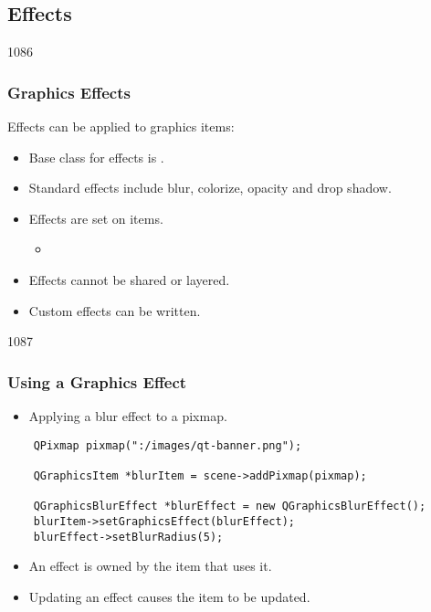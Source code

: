 \subsection{Effects}

\begin{slide}{1086}\frametitle{Graphics Effects}

Effects can be applied to graphics items:

\begin{itemize}
\item Base class for effects is .
\item Standard effects include blur, colorize, opacity and drop shadow.
\item Effects are set on items.
  \begin{itemize}
  \item {}
  \end{itemize}
\item Effects cannot be shared or layered.
\item Custom effects can be written.
\end{itemize}

\begin{center}
\end{center}

\end{slide}

\begin{slide}[fragile]{1087}\frametitle{Using a Graphics Effect}

\begin{itemize}
\item Applying a blur effect to a pixmap.
\end{itemize}

\begin{lstlisting}
    QPixmap pixmap(":/images/qt-banner.png");

    QGraphicsItem *blurItem = scene->addPixmap(pixmap);

    QGraphicsBlurEffect *blurEffect = new QGraphicsBlurEffect();
    blurItem->setGraphicsEffect(blurEffect);
    blurEffect->setBlurRadius(5);
\end{lstlisting}

\begin{itemize}
\item An effect is owned by the item that uses it.
\item Updating an effect causes the item to be updated.
\end{itemize}

\end{slide}

